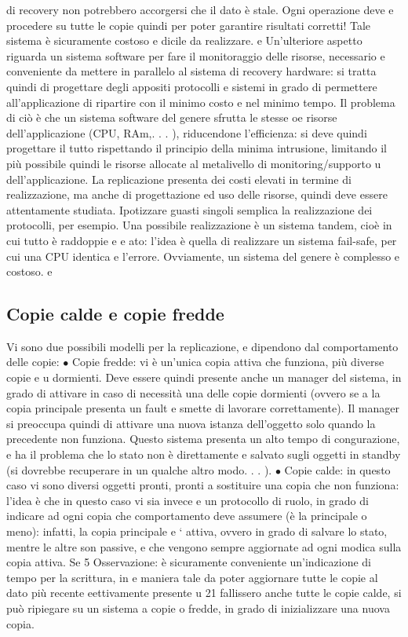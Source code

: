 di recovery non potrebbero accorgersi che il dato è stale. Ogni operazione deve
e
procedere su tutte le copie quindi per poter garantire risultati corretti! Tale
sistema è sicuramente costoso e dicile da realizzare.
e
Un'ulteriore aspetto riguarda un sistema software per fare il monitoraggio
delle risorse, necessario e conveniente da mettere in parallelo al sistema di recovery hardware: si tratta quindi di
progettare degli appositi protocolli e sistemi in
grado di permettere all'applicazione di ripartire con il minimo costo e nel minimo
tempo. Il problema di ciò è che un sistema software del genere sfrutta le stesse
oe
risorse dell'applicazione (CPU, RAm,. . . ), riducendone l'efficienza: si deve quindi progettare il tutto rispettando il
principio della minima intrusione, limitando
il più possibile quindi le risorse allocate al metalivello di monitoring/supporto
u
dell'applicazione. La replicazione presenta dei costi elevati in termine di realizzazione, ma anche di progettazione ed
uso delle risorse, quindi deve essere
attentamente studiata. Ipotizzare guasti singoli semplica la realizzazione dei
protocolli, per esempio.
Una possibile realizzazione è un sistema tandem, cioè in cui tutto è raddoppie
e
e
ato: l'idea è quella di realizzare un sistema fail-safe, per cui una CPU identica
e
l'errore. Ovviamente, un sistema del genere è complesso e costoso.
e
\subsection{Copie calde e copie fredde}
Vi sono due possibili modelli per la replicazione, e dipendono dal comportamento
delle copie:
$\bullet$ Copie fredde: vi è un'unica copia attiva che funziona, più diverse copie
e
u
dormienti. Deve essere quindi presente anche un manager del sistema, in
grado di attivare in caso di necessità una delle copie dormienti (ovvero se
a
la copia principale presenta un fault e smette di lavorare correttamente).
Il manager si preoccupa quindi di attivare una nuova istanza dell'oggetto
solo quando la precedente non funziona. Questo sistema presenta un alto
tempo di congurazione, e ha il problema che lo stato non è direttamente
e
salvato sugli oggetti in standby (si dovrebbe recuperare in un qualche altro
modo. . . ).
$\bullet$ Copie calde: in questo caso vi sono diversi oggetti pronti, pronti a sostituire una copia che non funziona:
l'idea è che in questo caso vi sia invece
e
un protocollo di ruolo, in grado di indicare ad ogni copia che comportamento deve assumere (è la principale o meno):
infatti, la copia principale
e
` attiva, ovvero in grado di salvare lo stato, mentre le altre son passive,
e
che vengono sempre aggiornate ad ogni modica sulla copia attiva. Se
5 Osservazione: è sicuramente conveniente un'indicazione di tempo per la scrittura, in
e
maniera tale da poter aggiornare tutte le copie al dato più recente eettivamente presente
u
21
fallissero anche tutte le copie calde, si può ripiegare su un sistema a copie
o
fredde, in grado di inizializzare una nuova copia.
